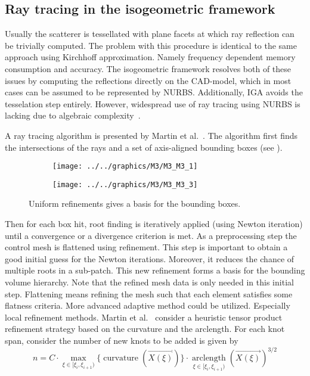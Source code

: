 \subsection{Ray tracing in the isogeometric framework}
Usually the scatterer is tessellated with plane facets at which ray reflection can be trivially computed. The problem with this procedure is identical to the same approach using Kirchhoff approximation. Namely frequency dependent memory consumption and accuracy. The isogeometric framework resolves both of these issues by computing the reflections directly on the CAD-model, which in most cases can be assumed to be represented by NURBS. Additionally, IGA avoids the tesselation step entirely. However, widespread use of ray tracing using NURBS is lacking due to algebraic complexity~\cite{Martin2000prt}.

A ray tracing algorithm is presented by Martin et al.~\cite{Martin2000prt}. The algorithm first finds the intersections of the rays and a set of axis-aligned bounding boxes (see ).
\begin{figure}
	\centering
	\begin{subfigure}[t]{\textwidth}
		\centering
		\texttt{[image: ../../graphics/M3/M3\_M3\_1]}
	\end{subfigure}%
	
	\begin{subfigure}[t]{\textwidth}
		\centering
		\texttt{[image: ../../graphics/M3/M3\_M3\_3]}
	\end{subfigure}
	\caption{Uniform refinements gives a basis for the bounding boxes.}
	\label{Fig:M3_M3}
\end{figure}
Then for each box hit, root finding is iteratively applied (using Newton iteration) until a convergence or a divergence criterion is met. As a preprocessing step the control mesh is flattened using refinement. This step is important to obtain a good initial guess for the Newton iterations. Moreover, it reduces the chance of multiple roots in a sub-patch. This new refinement forms a basis for the bounding volume hierarchy. Note that the refined mesh data is only needed in this initial step. Flattening means refining the mesh such that each element satisfies some flatness criteria. More advanced adaptive method could be utilized. Especially local refinement methods. Martin et al.~\cite{Martin2000prt} consider a heuristic tensor product refinement strategy based on the curvature and the arclength. For each knot span, consider the number of new knots to be added is given by
\begin{equation*}
	n = C\cdot\max_{\xi\in[\xi_i,\xi_{i+1})}\{\operatorname{curvature}(\vec{X(\xi)})\}\cdot\underset{\xi\in[\xi_i,\xi_{i+1})}{\operatorname{arclength}}(\vec{X(\xi)})^{3/2}
\end{equation*}
